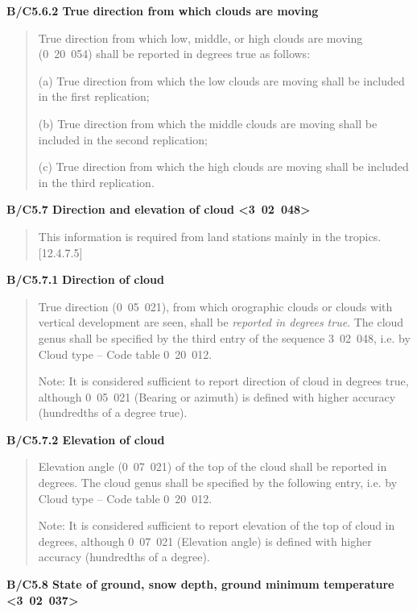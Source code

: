 \textbf{B/C5.6.2 True direction from which clouds are moving}

\begin{quote}
True direction from which low, middle, or high clouds are moving (0~20~054) shall be reported in degrees true as follows:

(a) True direction from which the low clouds are moving shall be included in the first replication;

(b) True direction from which the middle clouds are moving shall be included in the second replication;

(c) True direction from which the high clouds are moving shall be included in the third replication.
\end{quote}

\textbf{B/C5.7 Direction and elevation of cloud \textless3~02~048\textgreater{}}

\begin{quote}
This information is required from land stations mainly in the tropics. {[}12.4.7.5{]}
\end{quote}

\textbf{B/C5.7.1} \textbf{Direction of cloud}

\begin{quote}
True direction (0~05~021), from which orographic clouds or clouds with vertical development are seen, shall be \emph{reported in degrees true}. The cloud genus shall be specified by the third entry of the sequence 3~02~048, i.e. by Cloud type -- Code table 0~20~012.

Note: It is considered sufficient to report direction of cloud in degrees true, although 0~05~021 (Bearing or azimuth) is defined with higher accuracy (hundredths of a degree true).
\end{quote}

\textbf{B/C5.7.2 Elevation of cloud}

\begin{quote}
Elevation angle (0~07~021) of the top of the cloud shall be reported in degrees. The cloud genus shall be specified by the following entry, i.e. by Cloud type -- Code table 0~20~012.

Note: It is considered sufficient to report elevation of the top of cloud in degrees, although 0~07~021 (Elevation angle) is defined with higher accuracy (hundredths of a degree).
\end{quote}

\textbf{B/C5.8 State of ground, snow depth, ground minimum temperature \textless3~02~037\textgreater{}}

